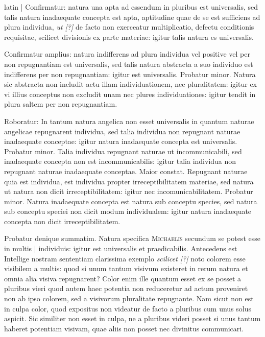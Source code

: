\begin{otherlanguage*}{latin}
\pstart
\textnormal{|} Confirmatur:
natura una apta ad essendum in pluribus est universalis, sed talis natura inadaequate concepta est apta, aptitudine quae de se est sufficiens ad plura individua, \emph{ut [?]} de facto non exerceatur multiplicatio, defectu conditionis requisitae, scilicet divisionis ex parte materiae:
igitur talis natura es universalis. 
\pend

\pstart
Confirmatur amplius:
natura indifferens ad plura individua vel positive vel per non repugnantiam est universalis, sed talis natura abstracta a suo individuo est indifferens per non repugnantiam:
igitur est universalis. Probatur minor. Natura sic abstracta non includit actu illam individuationem, nec pluralitatem:
igitur ex vi illius conceptus non excludit unam nec plures individuationes:
igitur tendit in plura saltem per non repugnantiam. 
\pend

\pstart
Roboratur:
In tantum natura angelica non esset universalis in quantum naturae angelicae repugnarent individua, sed talia individua non repugnant naturae inadaequate conceptae:
igitur natura inadaequate concepta est universalis. Probatur minor. Talia individua repugnant naturae ut incommunicabili, sed inadaequate concepta non est incommunicabilis:
igitur talia individua non repugnant naturae inadaequate conceptae. Maior constat. Repugnant naturae quia est individua, est individua propter irreceptibilitatem materiae, sed natura ut natura non dicit irreceptibilitatem:
igitur nec incomunicabilitatem. Probatur minor. Natura inadaequate concepta est natura sub conceptu species, sed natura sub conceptu speciei non dicit modum individualem:
igitur natura inadaequate concepta non dicit irreceptibilitatem. 
\pend

\pstart
Probatur denique summatim. Natura specifica \textsc{Michaelis}\index[persons]{} secundum se potest esse in multis \textnormal{|} individuis:
igitur est universalis et praedicabilis. Antecedens est  Intellige nostram sententiam clarissima exemplo \emph{scilicet [?]}  noto colorem esse visibilem a multis:
quod si unum tantum visivum existeret in rerum natura et omnia alia visiva repugnarent? Color enim ille quantum esset ex se posset a pluribus vieri quod autem haec potentia non reduceretur ad actum proveniret non ab ipso colorem, sed a visivorum pluralitate repugnante. Nam sicut non est in culpa color, quod expositus non videatur de facto a pluribus cum unus solus aspicit. Sic similiter non esset in culpa, ne a pluribus videri posset si unus tantum haberet potentiam visivam, quae aliis non posset nec divinitus communicari. 
\pend


\end{otherlanguage*}
